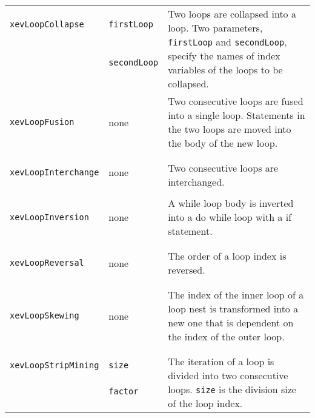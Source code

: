 \begin{longtable}[l]{l|l|l}
\texttt{xevLoopCollapse} & \texttt{firstLoop} & \multirow{3}{9cm}{Two
 loops are collapsed into a loop. Two parameters, \texttt{firstLoop} and
 \texttt{secondLoop}, specify the names of index variables of the loops
 to be collapsed. } \\
& \texttt{secondLoop} & \\ &&\\ \hline


\texttt{xevLoopFusion} & none & \multirow{1}{9cm}{Two consecutive loops are
 fused into a single loop. Statements in the two loops are moved into
 the body of the new loop.} \\
 &&\\ &&\\ \hline

\texttt{xevLoopInterchange} & none & \multirow{2}{9cm}{Two
 consecutive loops are interchanged.} \\
&&\\ &&\\ \hline

\texttt{xevLoopInversion} & none & \multirow{1}{9cm}{A while loop body is
inverted into a do while loop with a if statement.} \\
 &&\\ &&\\ \hline

\texttt{xevLoopReversal} & none & \multirow{1}{9cm}{The order of a loop index
is reversed.} \\
 &&\\ &&\\ \hline

\texttt{xevLoopSkewing} & none & \multirow{1}{9cm}{The index of the inner loop of
a loop nest is transformed into a new one that is dependent on the index of the outer loop.} \\
 &&\\ &&\\ \hline

\texttt{xevLoopStripMining} & \texttt{size} & \multirow{3}{9cm}{The iteration 
of a loop is divided into two consecutive loops. \texttt{size} is
the division size of the loop index.} \\ &
 \texttt{factor} & \\ &&\\ \hline


\end{longtable}
